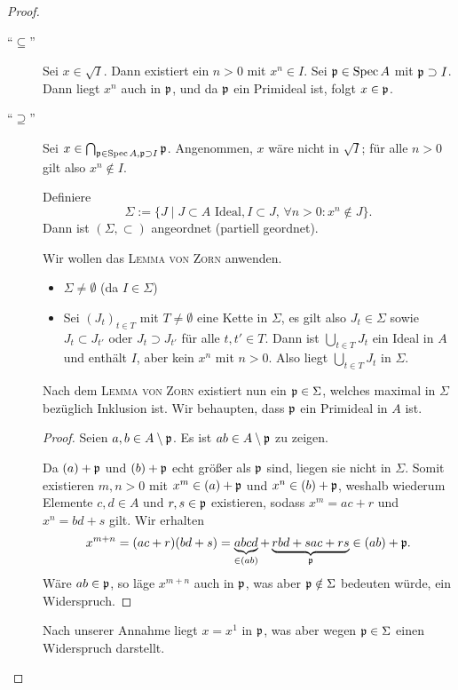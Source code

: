 \documentclass[12pt,a4paper]{scrartcl}
\theoremstyle{cplain}
\theoremstyle{cdef}
\begin{document}
\begin{proof}
    \leavevmode
    \begin{description}
        \item[\enquote{$\subseteq$}] Sei $x\in \sqrt{I}$. Dann existiert ein $n>0$ mit $x^n\in I$.
        Sei $\mathfrak{p}\in \operatorname{Spec} A$ mit $\mathfrak{p}\supset I$. Dann liegt $x^n$ auch in $\mathfrak{p}$, und da $\mathfrak{p}$ ein Primideal ist, folgt $x \in \mathfrak{p}$.
        \item[\enquote{$\supseteq$}] Sei $x\in \bigcap_{\mathfrak{p}\in \operatorname{Spec} A, \mathfrak{p}\supset I}\mathfrak{p}$. Angenommen, $x$ wäre nicht in $\sqrt{I}$; für alle $n>0$ gilt also $x^n\not \in I$.

        Definiere \[\Sigma := \{J \mid J\subset A \text{ Ideal}, I\subset J,\, \forall n>0: x^n\not \in J\}.\]
        Dann ist $(\Sigma, \subset)$ angeordnet (partiell geordnet).
        
        Wir wollen das \textsc{Lemma von Zorn} anwenden.
        \begin{itemize}
            \item $\Sigma \neq \emptyset$ (da $I\in \Sigma$)
            \item Sei $(J_t)_{t\in T}$ mit $T \neq \emptyset$ eine Kette in $\Sigma$, es gilt also $J_t \in \Sigma$ sowie $J_t \subset J_{t'}$ oder $J_t \supset J_{t'}$ für alle $t,t'\in T$.
            Dann ist $\bigcup_{t\in T} J_t$ ein Ideal in $A$ und enthält $I$, aber kein $x^n$ mit $n>0$. Also liegt $\bigcup_{t\in T} J_t$ in $\Sigma$.
        \end{itemize}
        
        Nach dem \textsc{Lemma von Zorn} existiert nun ein $\mathfrak{p} \in \Sigma$, welches maximal in $\Sigma$ bezüglich Inklusion ist. Wir behaupten, dass $\mathfrak{p}$ ein Primideal in $A$ ist.
        \begin{proof}
            Seien $a, b \in A \setminus \mathfrak{p}$. Es ist $ab\in A\setminus \mathfrak{p}$ zu zeigen.
            
            Da $(a)+\mathfrak{p}$ und $(b)+\mathfrak{p}$ echt größer als $\mathfrak{p}$ sind, liegen sie nicht in $\Sigma$. Somit existieren $m,n>0$ mit $x^m \in (a) + \mathfrak{p}$ und $x^n \in (b) + \mathfrak{p}$, weshalb wiederum Elemente $c,d\in A$ und $r,s \in \mathfrak{p}$ existieren, sodass $x^m = ac+r$ und $x^n = bd+s$ gilt. Wir erhalten \[x^{m+n} = (ac+r)(bd+s) = \underbrace{abcd}_{\in (ab)} + \underbrace{rbd + sac + rs}_{\mathfrak{p}} \in (ab)+\mathfrak{p}. \]
            Wäre $ab \in \mathfrak{p}$, so läge $x^{m+n}$ auch in $\mathfrak{p}$, was aber $\mathfrak{p} \notin \Sigma$ bedeuten würde, ein Widerspruch.
        \end{proof}

        Nach unserer Annahme liegt $x=x^1$ in $\mathfrak{p}$, was aber wegen $\mathfrak{p} \in \Sigma$ einen Widerspruch darstellt.
        \qedhere
    \end{description}
\end{proof}
\end{document}
